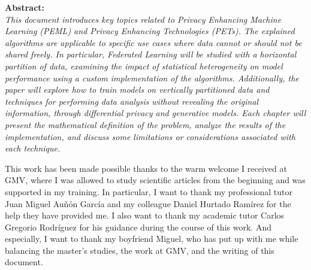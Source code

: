 \documentclass[oneside, openany]{book}
\begin{document}


\vspace*{5 em}

\begin{center}
\textbf{Abstract:}\\
\textit{
This document introduces key topics related to Privacy Enhancing Machine Learning (PEML) and Privacy Enhancing Technologies (PETs).
The explained algorithms are applicable to specific use cases where data cannot or should not be shared freely. In particular, Federated Learning will be studied with a horizontal partition of data, examining the impact of statistical heterogeneity on model performance using a custom implementation of the algorithms. Additionally, the paper will explore how to train models on vertically partitioned data and techniques for performing data analysis without revealing the original information, through differential privacy and generative models. Each chapter will present the mathematical definition of the problem, analyze the results of the implementation, and discuss some limitations or considerations associated with each technique.\\
}
\end{center}


\vspace*{25 em}


This work has been made possible thanks to the warm welcome I received at GMV, where I was allowed to study scientific articles from the beginning and was supported in my training. In particular, I want to thank my professional tutor Juan Miguel Auñón García and my colleague Daniel Hurtado Ramírez for the help they have provided me. I also want to thank my academic tutor Carlos Gregorio Rodríguez for his guidance during the course of this work. And especially, I want to thank my boyfriend Miguel, who has put up with me while balancing the master’s studies, the work at GMV, and the writing of this document.


\normalfont
\tableofcontents





\backmatter



\printbibliography
\end{document}
